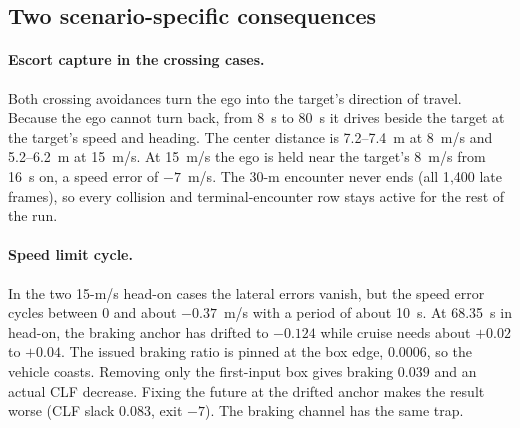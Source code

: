 \documentclass[11pt]{article}
\begin{document}
\subsection{Two scenario-specific consequences}
\paragraph{Escort capture in the crossing cases.} Both crossing avoidances turn
the ego into the target's direction of travel. Because the ego cannot turn back,
from 8~s to 80~s it drives beside the target at the target's speed and heading.
The center distance is 7.2--7.4~m at 8~m/s and 5.2--6.2~m at 15~m/s. At
15~m/s the ego is held near the target's 8~m/s from 16~s on, a speed error of
$-7$~m/s. The 30-m encounter never ends (all 1{,}400 late
frames), so every collision and terminal-encounter row stays active for the
rest of the run.

\paragraph{Speed limit cycle.}\label{sec:speed} In the two 15-m/s head-on cases
the lateral errors vanish, but the speed error cycles between 0 and about
$-0.37$~m/s with a period of about 10~s. At 68.35~s in head-on, the braking
anchor has drifted to $-0.124$ while cruise needs about $+0.02$ to $+0.04$. The
issued braking ratio is pinned at the box edge, $0.0006$, so the vehicle
coasts. Removing only the first-input box gives braking $0.039$ and an actual
CLF decrease. Fixing the future at the drifted anchor makes the result worse
(CLF slack 0.083, exit $-7$). The braking channel has the same trap.
\end{document}
